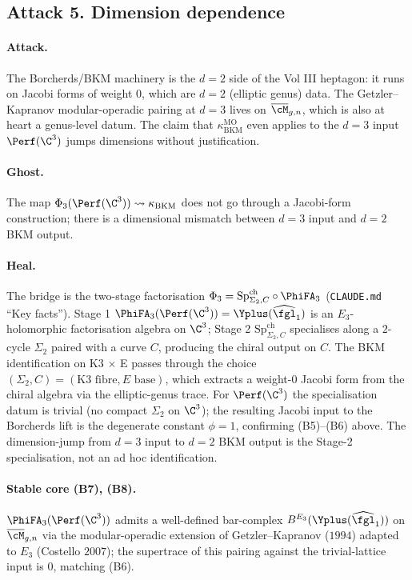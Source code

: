 \subsection*{Attack 5.  Dimension dependence}

\paragraph{Attack.} The Borcherds/BKM machinery is the $d = 2$
side of the Vol III heptagon: it runs on Jacobi forms of weight
$0$, which are $d = 2$ (elliptic genus) data. The Getzler--Kapranov
modular-operadic pairing at $d = 3$ lives on
$\overline{\cM}_{g, n}$, which is also at heart a genus-level
datum. The claim that $\kappa_{\mathrm{BKM}}^{\mathrm{MO}}$ even
applies to the $d = 3$ input $\Perf(\C^3)$ jumps dimensions
without justification.

\paragraph{Ghost.} The map $\Phi_3(\Perf(\C^3)) \leadsto
\kappa_{\mathrm{BKM}}$ does not go through a Jacobi-form
construction; there is a dimensional mismatch between
$d = 3$ input and $d = 2$ BKM output.

\paragraph{Heal.} The bridge is the two-stage factorisation
$\Phi_3 = \mathrm{Sp}^{\mathrm{ch}}_{\Sigma_2, C} \circ
\PhiFA_3$ (\texttt{CLAUDE.md} ``Key facts''). Stage 1
$\PhiFA_3(\Perf(\C^3)) = \Yplus(\widehat{\fgl}_1)$ is an
$E_3$-holomorphic factorisation algebra on $\C^3$; Stage 2
$\mathrm{Sp}^{\mathrm{ch}}_{\Sigma_2, C}$ specialises along a
$2$-cycle $\Sigma_2$ paired with a curve $C$, producing the chiral
output on $C$. The BKM identification on K3 $\times$ E passes
through the choice $(\Sigma_2, C) = (\mathrm{K}3\text{ fibre},
E\text{ base})$, which extracts a weight-$0$ Jacobi form from the
chiral algebra via the elliptic-genus trace. For
$\Perf(\C^3)$ the specialisation datum is trivial (no compact
$\Sigma_2$ on $\C^3$); the resulting Jacobi input to the Borcherds
lift is the degenerate constant $\phi = 1$, confirming
(B5)--(B6) above. The dimension-jump from $d = 3$ input to
$d = 2$ BKM output is the Stage-2 specialisation, not an ad hoc
identification.

\paragraph{Stable core (B7), (B8).} $\PhiFA_3(\Perf(\C^3))$ admits
a well-defined bar-complex $B^{E_3}(\Yplus(\widehat{\fgl}_1))$ on
$\overline{\cM}_{g, n}$ via the modular-operadic extension of
Getzler--Kapranov ($1994$) adapted to $E_3$ (Costello $2007$);
the supertrace of this pairing against the trivial-lattice
input is $0$, matching (B6).

